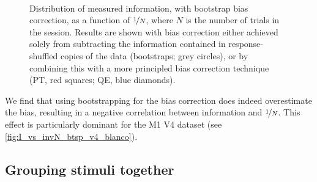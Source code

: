 \begin{figure}[htbp]
    \centering
    \hspace*{\fill}
    \hspace*{\fill}\hspace{.2cm}\hspace*{\fill}
    \hspace*{\fill}
    \\
    \hspace*{\fill}
    \hspace*{\fill}\hspace{.2cm}\hspace*{\fill}
    \hspace*{\fill}
    \caption{
    Distribution of measured information, with bootstrap bias correction, as a function of $\nicefrac{1}{N}$, where $N$ is the number of trials in the session.
Results are shown with bias correction either achieved solely from subtracting the information contained in response-shuffled copies of the data (bootstraps; grey circles), or by combining this with a more principled bias correction technique (\ac{PT}, red squares; \ac{QE}, blue diamonds).
}
    \label{fig:I_vs_invN_btsp}
\end{figure}

We find that using bootstrapping for the bias correction does indeed overestimate the bias, resulting in a negative correlation between information and $\nicefrac{1}{N}$.
This effect is particularly dominant for the \ac{M1} \ac{V4} dataset (see \autoref{fig:I_vs_invN_btsp_v4_blanco}).

\subsection{Grouping stimuli together}
\label{sec:pl_bias_grouping}

